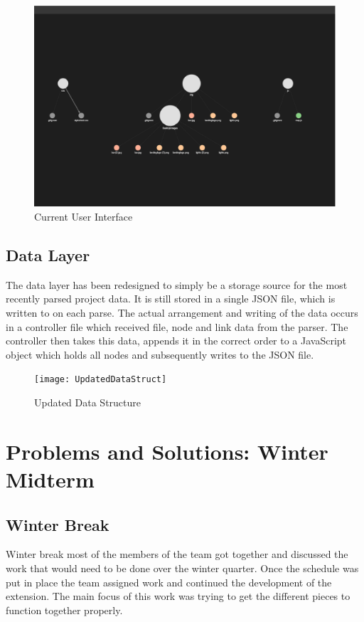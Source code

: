 \documentclass[letterpaper,10pt,titlepage,draftclsnofoot,onecolumn,onesided] {IEEEtran}
\begin{document}
	\begin{figure}
		\includegraphics[width=450px]{capstoneUI1}
		\caption{Current User Interface}
	\end{figure}

	\subsection{Data Layer}
	The data layer has been redesigned to simply be a storage source for the most recently parsed project data.
	It is still stored in a single JSON file, which is written to on each parse.
	The actual arrangement and writing of the data occurs in a controller file which received file, node and link data from the parser.
	The controller then takes this data, appends it in the correct order to a JavaScript object which holds all nodes and subsequently writes to the JSON file.
	\begin{figure}
		\texttt{[image: UpdatedDataStruct]}
		\caption{Updated Data Structure}
	\end{figure}

\section{Problems and Solutions: Winter Midterm }
	\subsection{Winter Break}
	Winter break most of the members of the team got together and discussed the work that would need to be done over the winter quarter.
	Once the schedule was put in place the team assigned work and continued the development of the extension. 
	The main focus of this work was trying to get the different pieces to function together properly. 
	
\end{document}
